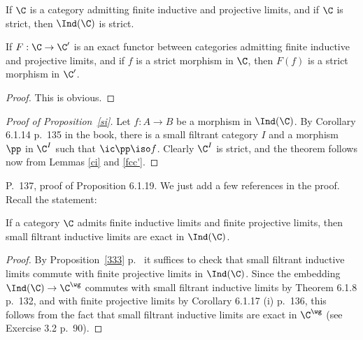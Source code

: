 \documentclass[12pt]{article}
\theoremstyle{remark}
\theoremstyle{definition}
\begin{document}
\begin{s}

\begin{prop} 
If $\C$ is a category admitting finite inductive and projective limits, and if $\C$ is strict, then $\Ind(\C)$ is strict. 
\end{prop} 

\begin{lem} 
If $F:\C\to\C'$ is an exact functor between categories admitting finite inductive and projective limits, and if $f$ is a strict morphism in $\C$, then $F(f)$ is a strict morphism in $\C'$. 
\end{lem}

\begin{proof} 
This is obvious. 
\end{proof} 

\begin{proof}[Proof of Proposition~\ref{si}] 
Let $f:A\to B$ be a morphism in $\Ind(\C)$. By Corollary 6.1.14 p.~135 in the book, there is a small filtrant category $I$ and a morphism $\pp$ in $\C^I$ such that $\ic\pp\iso f$. Clearly $\C^I$ is strict, and the theorem follows now from Lemmas \ref{ci} and \ref{fcc'}. 
\end{proof}

\end{s}

% 

\begin{s} 
P.~137, proof of Proposition 6.1.19. We just add a few references in the proof. Recall the statement:
\begin{prop}
If a category $\C$ admits finite inductive limits and finite projective limits, then small filtrant inductive limits are exact in $\Ind(\C)$.
\end{prop}
\begin{proof}
By Proposition~\ref{333} p.~ it suffices to check that small filtrant inductive limits commute with finite projective limits in $\Ind(\C)$. Since the embedding $\Ind(\C)\to\C^\wg$ commutes with small filtrant inductive limits by Theorem 6.1.8 p.~132, and with finite projective limits by Corollary 6.1.17 (i) p.~136, this follows from the fact that small filtrant inductive limits are exact in $\C^\wg$ (see Exercise 3.2 p.~90).
\end{proof}
\end{s}
\end{document}
